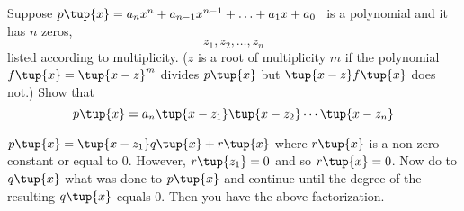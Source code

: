 \begin{enumialphparenastyle}
\begin{ex} Suppose $p\tup{x} =a_{n}x^{n}+a_{n-1}x^{n-1}+\ldots+a_{1}x+a_{0}$ \ is a polynomial and it has $n$ zeros,
\begin{equation*}
z_{1},z_{2},\ldots,z_{n}
\end{equation*}
listed according to multiplicity. ($z$ is a root of multiplicity $m$ if the
polynomial $f\tup{x} =\tup{x-z} ^{m}$ divides $p\tup{
x} $ but $\tup{x-z} f\tup{x} $ does not.) Show that
\begin{equation*}
p\tup{x} =a_{n}\tup{x-z_{1}} \tup{x-z_{2}} \cdots
\tup{x-z_{n}} 
\end{equation*} 
\begin{sol}
$p\tup{x} =\tup{x-z_{1}} q\tup{x} +r\tup{x} $
where $r\tup{x} $ is a non-zero constant or equal to $0$. However, $r\tup{z_{1}} =0$ and so $r\tup{x} =0$. Now do to $q\tup{
x} $ what was done to $p\tup{x} $ and continue until the
degree of the resulting $q\tup{x} $ equals $0$. Then you have the
above factorization.
\end{sol}
\end{ex}

\end{enumialphparenastyle}
